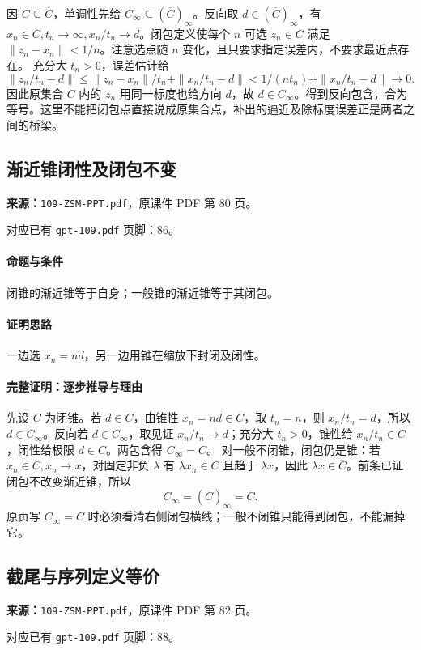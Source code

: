 因 $C\subseteq\overline C$，单调性先给 $C_\infty\subseteq(\overline C)_\infty$。反向取 $d\in(\overline C)_\infty$，有 $x_n\in\overline C,t_n\to\infty,x_n/t_n\to d$。闭包定义使每个 $n$ 可选 $z_n\in C$ 满足 $\|z_n-x_n\|<1/n$。注意选点随 $n$ 变化，且只要求指定误差内，不要求最近点存在。
充分大 $t_n>0$，误差估计给
\[\|z_n/t_n-d\|\le\|z_n-x_n\|/t_n+\|x_n/t_n-d\|<1/(nt_n)+\|x_n/t_n-d\|\to0.\]
因此原集合 $C$ 内的 $z_n$ 用同一标度也给方向 $d$，故 $d\in C_\infty$。得到反向包含，合为等号。这里不能把闭包点直接说成原集合点，补出的逼近及除标度误差正是两者之间的桥梁。

\clearpage\subsection{渐近锥闭性及闭包不变}
\textbf{来源：}\texttt{109-ZSM-PPT.pdf}，原课件 PDF 第 80 页。\par
对应已有 \texttt{gpt-109.pdf} 页脚：86。\par
\paragraph{命题与条件}闭锥的渐近锥等于自身；一般锥的渐近锥等于其闭包。
\paragraph{证明思路}一边选 $x_n=nd$，另一边用锥在缩放下封闭及闭性。
\paragraph{完整证明：逐步推导与理由}

先设 $C$ 为闭锥。若 $d\in C$，由锥性 $x_n=nd\in C$，取 $t_n=n$，则 $x_n/t_n=d$，所以 $d\in C_\infty$。反向若 $d\in C_\infty$，取见证 $x_n/t_n\to d$；充分大 $t_n>0$，锥性给 $x_n/t_n\in C$，闭性给极限 $d\in C$。两包含得 $C_\infty=C$。
对一般不闭锥，闭包仍是锥：若 $x_n\in C,x_n\to x$，对固定非负 $\lambda$ 有 $\lambda x_n\in C$ 且趋于 $\lambda x$，因此 $\lambda x\in\overline C$。前条已证闭包不改变渐近锥，所以
\[C_\infty=(\overline C)_\infty=\overline C.\]
原页写 $C_\infty=C$ 时必须看清右侧闭包横线；一般不闭锥只能得到闭包，不能漏掉它。

\clearpage\subsection{截尾与序列定义等价}
\textbf{来源：}\texttt{109-ZSM-PPT.pdf}，原课件 PDF 第 82 页。\par
对应已有 \texttt{gpt-109.pdf} 页脚：88。\par
